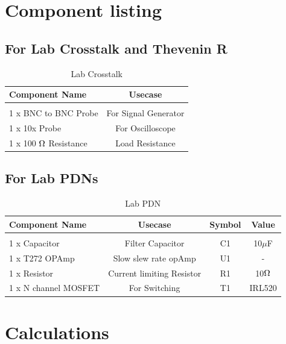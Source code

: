 \documentclass[a4paper,11pt]{article}%
\begin{document}
\pagebreak

\section{Component listing}

\subsection{For Lab Crosstalk and Thevenin R}
	\begin{table}[H]
		\centering

		\begin{tabular}{l c}
			\hline
			\textbf{Component Name}&\textbf{Usecase}\\\hline
			\\
	1 x BNC to BNC Probe&For Signal Generator\\
	1 x 10x Probe&For Oscilloscope \\
	1 x 100 $\ohm$ Resistance&Load Resistance \\
	\hline\hline
		\end{tabular}
		\caption{Lab Crosstalk}
		\label{filterspecs}
	\end{table}

\subsection{For Lab PDNs}
	\begin{table}[H]
		\centering

		\begin{tabular}{l c c c}
			\hline
			\textbf{Component Name}&\textbf{Usecase}&\textbf{Symbol}&\textbf{Value}\\\hline
			&&\\
	1 x Capacitor&Filter Capacitor&C1&10$\mu$F\\
	1 x T272 OPAmp&Slow slew rate opAmp&U1&-\\
	1 x Resistor&Current limiting Resistor&R1&10$\ohm$\\
	1 x N channel MOSFET&For Switching&T1&IRL520\\
	\hline\hline
		\end{tabular}
		\caption{Lab PDN}
		\label{filterspecs}
	\end{table}



\section{Calculations}
\end{document}
